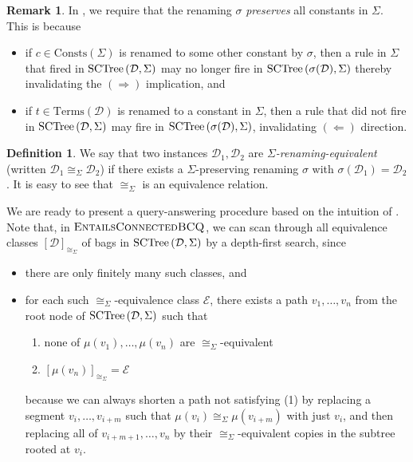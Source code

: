 \documentclass[12pt]{report}
\theoremstyle{plain}
\theoremstyle{definition}
\newtheorem{definition}[theorem]{Definition}
\newtheorem{remark}[theorem]{Remark}
\def\Consts{{\mathrm{Consts}}}
\def\Terms{{\mathrm{Terms}}}
\newcommand{\SCTree}[2]{\ensuremath{\normalfont{\textrm{SCTree}} \left( #1, #2 \right)}}
\begin{document}
\begin{remark}
  In , we require that the renaming $\sigma$ \emph{preserves} all constants in $\Sigma$. This is because \begin{itemize}
    \item if $c \in \Consts(\Sigma)$ is renamed to some other constant by $\sigma$, then a rule in $\Sigma$ that fired in $\SCTree{\mathcal{D}}{\Sigma}$ may no longer fire in $\SCTree{\sigma(\mathcal{D})}{\Sigma}$ thereby invalidating the $(\Longrightarrow)$ implication, and
    \item if $t \in \Terms(\mathcal{D})$ is renamed to a constant in $\Sigma$, then a rule that did not fire in $\SCTree{\mathcal{D}}{\Sigma}$ may fire in $\SCTree{\sigma(\mathcal{D})}{\Sigma}$, invalidating $(\Longleftarrow)$ direction.
  \end{itemize}
\end{remark}

\begin{definition}
  We say that two instances $\mathcal{D}_1, \mathcal{D}_2$ are \emph{$\Sigma$-renaming-equivalent} (written $\mathcal{D}_1 \cong_\Sigma \mathcal{D}_2$) if there exists a $\Sigma$-preserving renaming $\sigma$ with $\sigma(\mathcal{D}_1) = \mathcal{D}_2$. It is easy to see that $\cong_\Sigma$ is an equivalence relation.
\end{definition}

We are ready to present a query-answering procedure  based on the intuition of . Note that, in $\textsc{EntailsConnectedBCQ}$, we can scan through all equivalence classes $[\mathcal{D}]_{\cong_\Sigma}$ of bags in $\SCTree{\mathcal{D}}{\Sigma}$ by a depth-first search, since
\begin{itemize}
  \item there are only finitely many such classes, and
  \item for each such $\cong_\Sigma$-equivalence class $\mathcal{E}$, there exists a path $v_1, \ldots, v_n$ from the root node of $\SCTree{\mathcal{D}}{\Sigma}$ such that
  \begin{enumerate}
    \item none of $\mu(v_1), \ldots, \mu(v_n)$ are $\cong_\Sigma$-equivalent
    \item $[\mu(v_n)]_{\cong_\Sigma} = \mathcal{E}$
  \end{enumerate}
  because we can always shorten a path not satisfying (1) by replacing a segment $v_i, \ldots, v_{i+m}$ such that $\mu(v_i) \cong_\Sigma \mu(v_{i+m})$ with just $v_i$, and then replacing all of $v_{i+m+1}, \ldots, v_n$ by their $\cong_\Sigma$-equivalent copies in the subtree rooted at $v_i$.
\end{itemize}
\end{document}
